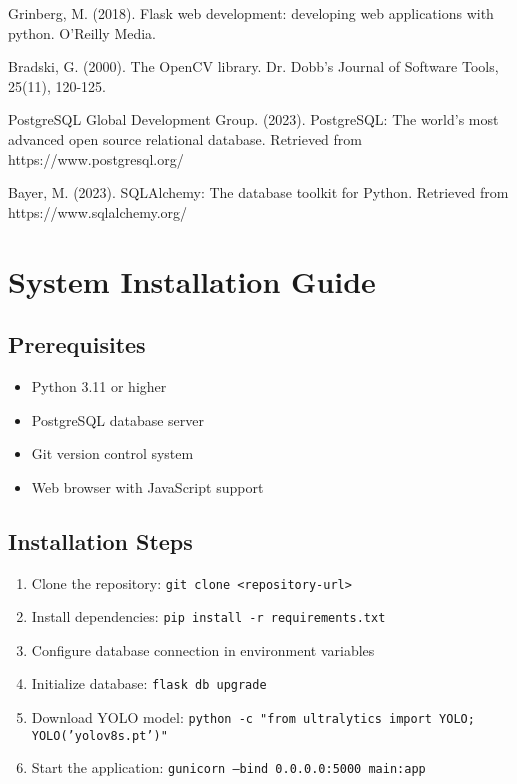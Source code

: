 \documentclass[12pt,a4paper]{report}
\begin{document}
\begin{thebibliography}{99}
Grinberg, M. (2018). Flask web development: developing web applications with python. O'Reilly Media.

Bradski, G. (2000). The OpenCV library. Dr. Dobb's Journal of Software Tools, 25(11), 120-125.

PostgreSQL Global Development Group. (2023). PostgreSQL: The world's most advanced open source relational database. Retrieved from https://www.postgresql.org/

Bayer, M. (2023). SQLAlchemy: The database toolkit for Python. Retrieved from https://www.sqlalchemy.org/

\end{thebibliography}

\appendix

\chapter{System Installation Guide}

\section{Prerequisites}
\begin{itemize}
    \item Python 3.11 or higher
    \item PostgreSQL database server
    \item Git version control system
    \item Web browser with JavaScript support
\end{itemize}

\section{Installation Steps}
\begin{enumerate}
    \item Clone the repository: \texttt{git clone <repository-url>}
    \item Install dependencies: \texttt{pip install -r requirements.txt}
    \item Configure database connection in environment variables
    \item Initialize database: \texttt{flask db upgrade}
    \item Download YOLO model: \texttt{python -c "from ultralytics import YOLO; YOLO('yolov8s.pt')"}
    \item Start the application: \texttt{gunicorn --bind 0.0.0.0:5000 main:app}
\end{enumerate}
\end{document}
